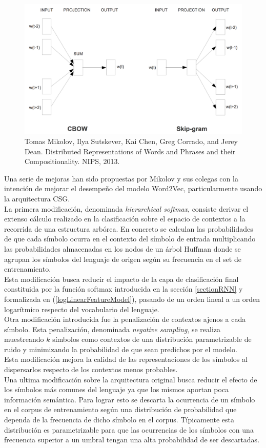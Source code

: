 \documentclass{article}
\begin{document}
	\begin{figure}[H]
		\centering
		\includegraphics[scale=0.4]{word2Vec.png}
		\caption{Tomas Mikolov, Ilya Sutskever, Kai Chen, Greg Corrado, and Jerey Dean. Distributed
			Representations of Words and Phrases and their Compositionality. NIPS, 2013.}
		\label{word2Vec}
	\end{figure}
	
	Una serie de mejoras han sido propuestas por Mikolov y sus colegas con la intención de mejorar el desempeño del modelo Word2Vec, particularmente usando la arquitectura CSG\cite{36MikolovImprovement}.\\
	La primera modificación, denominada \textit{hierarchical softmax}, consiste derivar el extenso cálculo realizado en la clasificación sobre el espacio de contextos a la recorrida de una estructura arbórea. En concreto se calculan las probabilidades de que cada símbolo ocurra en el contexto del símbolo de entrada multiplicando las probabilidades almacenadas en los nodos de un árbol Huffman donde se agrupan los símbolos del lenguaje de origen según su frecuencia en el set de entrenamiento.\\
	Esta modificación busca reducir el impacto de la capa de clasificación final constituida por la función softmax introducida en la sección \ref{sectionRNN} y formalizada en (\ref{logLinearFeatureModel}), pasando de un orden lineal a un orden logarítmico respecto del vocabulario del lenguaje.\\
	Otra modificación introducida fue la penalización de contextos ajenos a cada símbolo. Esta penalización, denominada \textit{negative sampling}, se realiza muestreando $k$ símbolos como contextos de una distribución parametrizable de ruido y minimizando la probabilidad de que sean predichos por el modelo.\\
	Esta modificación mejora la calidad de las representaciones de los símbolos al dispersarlos respecto de los contextos menos probables.\\
	Una ultima modificación sobre la arquitectura original busca reducir el efecto de los símbolos más comunes del lenguaje ya que los mismos aportan poca información semántica. Para lograr esto se descarta la ocurrencia de un símbolo en el corpus de entrenamiento según una distribución de probabilidad que dependa de la frecuencia de dicho símbolo en el corpus. Típicamente esta distribución es parametrizable para que las ocurrencias de los símbolos con una frecuencia superior a un umbral tengan una alta probabilidad de ser descartadas.
	
\end{document}
